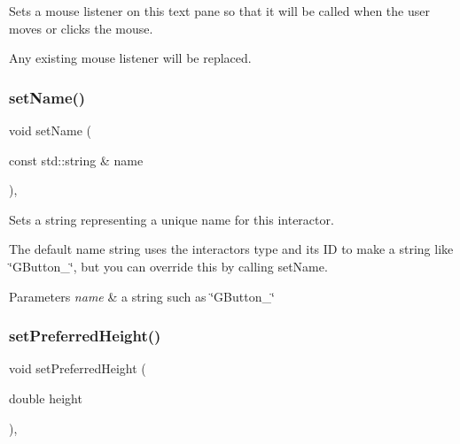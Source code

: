 Sets a mouse listener on this text pane so that it will be called when the user moves or clicks the mouse. 

Any existing mouse listener will be replaced. \mbox{\label{classGInteractor_a9d3a2685df23b5e7cbf59c19c4a1f9b5}} 
\subsubsection{\texorpdfstring{set\+Name()}{setName()}}
{\footnotesize\ttfamily void set\+Name (\begin{DoxyParamCaption}\item[{const std\+::string \&}]{name }\end{DoxyParamCaption})\hspace{0.3cm}{\ttfamily [virtual]}, {\ttfamily [inherited]}}



Sets a string representing a unique name for this interactor. 

The default name string uses the interactor\textquotesingle{}s type and its ID to make a string like \char`\"{}\+G\+Button\+\_\char`\"{}, but you can override this by calling set\+Name. 
\begin{DoxyParams}{Parameters}
{\em name} & a string such as \char`\"{}\+G\+Button\+\_\char`\"{} \\
\hline
\end{DoxyParams}
\mbox{\label{classGInteractor_a1ab987704fce32098706c6f00fb08218}} 
\subsubsection{\texorpdfstring{set\+Preferred\+Height()}{setPreferredHeight()}}
{\footnotesize\ttfamily void set\+Preferred\+Height (\begin{DoxyParamCaption}\item[{double}]{height }\end{DoxyParamCaption})\hspace{0.3cm}{\ttfamily [virtual]}, {\ttfamily [inherited]}}



